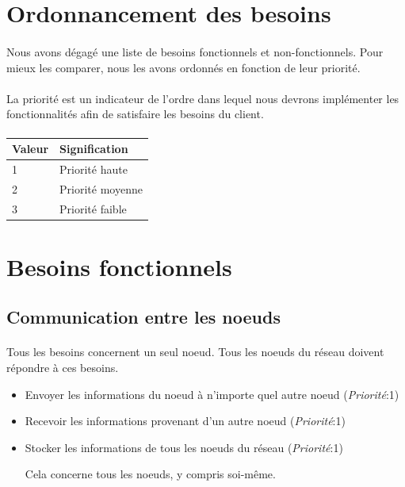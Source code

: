\documentclass[12pt]{article}
\newenvironment{besoins}
{ \begin{itemize}[topsep=20pt]   }
{ \end{itemize}                  }
\newcommand{\priority}[1] {
  (\textit{Priorité}:#1)
}
\newcommand{\besoin}[3]{
	\item #1 \priority{#2} #3
}
\begin{document}
\newpage

\section{Ordonnancement des besoins}

\paragraph{} Nous avons dégagé une liste de besoins fonctionnels et non-fonctionnels. 
Pour mieux les comparer, nous les avons ordonnés en fonction de leur priorité.

\paragraph{} La priorité est un indicateur de l'ordre dans lequel nous devrons implémenter les fonctionnalités afin de satisfaire les besoins du client.

\paragraph{}
\begin{tabular}{| l | M{12cm} |}
    \hline
    Valeur & Signification \tabularnewline
     & Priorité haute \tabularnewline
     & Priorité moyenne  \tabularnewline
     & Priorité faible  \tabularnewline
    \hline
 \end{tabular}


\newpage

\section{Besoins fonctionnels}

\subsection{Communication entre les noeuds}

\paragraph{} Tous les besoins concernent un seul noeud. Tous les noeuds du réseau doivent répondre à ces besoins.

\begin{besoins}
\besoin{Envoyer les informations du noeud à n'importe quel autre noeud}{1}
\besoin{Recevoir les informations provenant d'un autre noeud}{1}
\besoin{Stocker les informations de tous les noeuds du réseau}{1}{
Cela concerne tous les noeuds, y compris soi-même.
}
\end{besoins}
\end{document}

